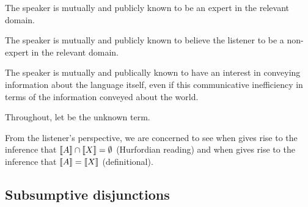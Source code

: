 \documentclass{article}
\begin{document}
\begin{examples}
\item The speaker is mutually and publicly known to be an expert in
  the relevant domain.
  
\item The speaker is mutually and publicly known to believe the
  listener to be a non-expert in the relevant domain.
  
\item The speaker is mutually and publically known to have an
  interest in conveying information about the language itself,
  even if this communicative inefficiency in terms of the 
  information conveyed about the world.
\end{examples}

\begin{examples}
\item Throughout, let  be the unknown term.

\item From the listener's perspective, we are concerned to see when
   gives rise to the inference that $\llbracket A\rrbracket \cap \llbracket X\rrbracket
  = \emptyset$ (Hurfordian reading) and when  gives rise
  to the inference that $\llbracket A\rrbracket = \llbracket X\rrbracket$ (definitional).
\end{examples}

\newcommand{\smallhurfordlex}[3]{
  \left[
    \begin{array}[c]{l@{ \ \mapsto \ }r l@{ \ \mapsto \ }r l@{ \ \mapsto \ }r}
      A & \set{#1} &
      B & \set{#2} &
      X & \set{#3}
    \end{array}
  \right]}


\subsection{Subsumptive disjunctions}\label{sec:analysis:subsumptive}
\end{document}
